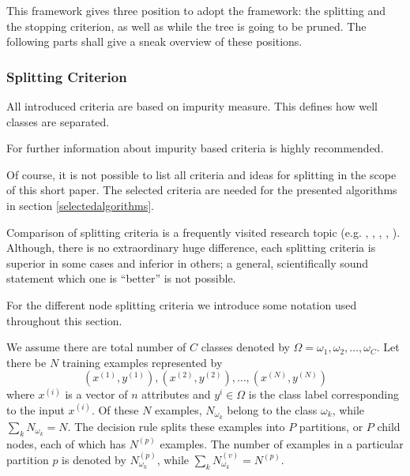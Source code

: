 This framework gives three position to adopt the framework: the splitting and the stopping criterion, as well as while the tree is going to be pruned. The following parts shall give a sneak overview of these positions. 

\newpage

\subsubsection{Splitting Criterion}

All introduced criteria are based on impurity measure. This defines how well classes are separated. 

\begin{remark}
 For further information about impurity based criteria \cite[p. 53 ff.]{rokach2008data} is highly recommended.
\end{remark}

Of course, it is not possible to list all criteria and ideas for splitting in the scope of this short paper. The selected criteria are needed for the presented algorithms in section \ref{selectedalgorithms}. 

Comparison of splitting criteria is a frequently visited research topic (e.g. \cite{breiman1996technical}, \cite{buntine1992further}, \cite{mingers1989empirical}, \cite{drummond2000exploiting}, \cite{shih1999families}). Although, there is no extraordinary huge difference, each splitting criteria is superior in some cases and inferior in others; a general, scientifically sound statement which one is ``better'' is not possible. 

For the different node splitting criteria we introduce some notation used throughout this section.

We assume there are total number of $C$ classes denoted by $\Omega = {\omega_1, \omega_2, \dots, \omega_C}$. Let there be $N$ training examples represented by
\begin{equation}
    \left(x^{(1)}, y^{(1)} \right), \left(x^{(2)}, y^{(2)} \right), \dots, \left(x^{(N)}, y^{(N)} \right)
\end{equation}
where $x^{(i)}$ is a vector of $n$ attributes and $y^{i} \in \Omega$ is the class label corresponding to the input $x^{(i)}$. Of these $N$ examples, $N_{\omega_k}$ belong to the class $\omega_k$, while $\sum_k N_{\omega_k} = N$. The decision rule splits these examples into $P$ partitions, or $P$ child nodes, each of which has $N^(p)$ examples. The number of examples in a particular partition $p$ is denoted by $N^{(p)}_{\omega_k}$, while $\sum_k N^{(v)}_{\omega_k} = N^{(p)}$.


